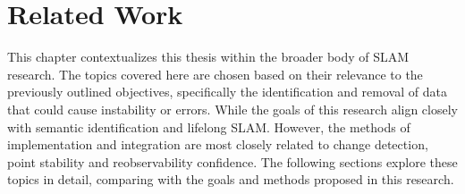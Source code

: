 \section{Related Work}
\label{sec:related_work}

This chapter contextualizes this thesis within the broader body of SLAM research. The topics covered here are chosen based on their relevance to the previously outlined objectives, specifically the identification and removal of data that could cause instability or errors. While the goals of this research align closely with semantic identification and lifelong SLAM. However, the methods of implementation and integration are most closely related to change detection, point stability and reobservability confidence. The following sections explore these topics in detail, comparing with the goals and methods proposed in this research.

% 